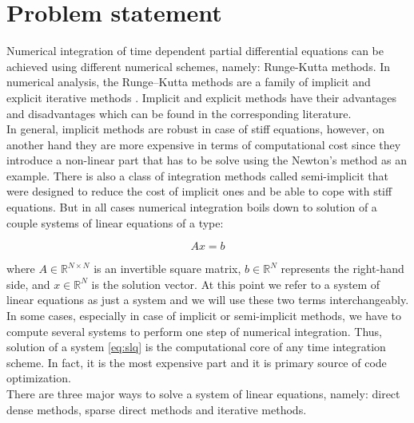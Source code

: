 \section{Problem statement} \label{subseq:problem-statement}


Numerical integration of time dependent partial differential equations can be achieved using different numerical schemes, namely: Runge-Kutta methods. In numerical analysis, the Runge–Kutta methods are a family of implicit and explicit iterative methods \cite{wiki:runge-kutta}. Implicit and explicit methods have their advantages and disadvantages which can be found in the corresponding literature.\\

 In general, implicit methods are robust in case of stiff equations, however, on another hand they are more expensive in terms of computational cost since they introduce a non-linear part that has to be solve using the Newton's method as an example. There is also a class of integration methods called semi-implicit that were designed to reduce the cost of implicit ones and be able to cope with stiff equations. But in all cases numerical integration boils down to solution of a couple systems of linear equations of a type:


\begin{equation} \label{eq:slq}
	Ax = b
\end{equation}


 where $A \in \mathbb{R}^{N \times N}$ is an invertible square matrix, $b \in \mathbb{R}^{N}$ represents the right-hand side, and $x \in \mathbb{R}^{N}$ is the solution vector. At this point we refer to a system of linear equations as just a system and we will use these two terms interchangeably. \\

 
In some cases, especially in case of implicit or semi-implicit methods, we have to compute several systems to perform one step of numerical integration. Thus, solution of a system \ref{eq:slq} is the computational core of any time integration scheme. In fact, it is the most expensive part and it is primary source of code optimization. \\ 


There are three major ways to solve a system of linear equations, namely: direct dense methods, sparse direct methods and iterative methods.\\

